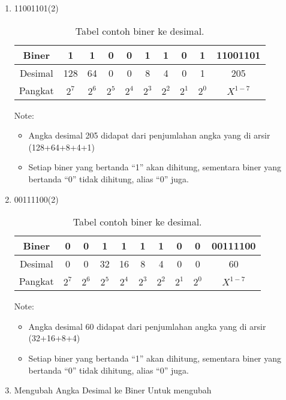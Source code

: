 \documentclass{article}
\begin{document}
\begin{enumerate}
\item 11001101(2) 

\begin{table}[h!]
\centering
\begin{tabular}{ |c|c|c|c|c|c|c|c|c|c| } 
\hline
Biner & 1 & 1 & 0 & 0 & 1 & 1 & 0 & 1 & 11001101 \\ 
\hline
Desimal & 128 & 64 & 0 & 0 & 8 & 4 & 0 & 1 & 205 \\ 
\hline
Pangkat & $2^7$ & $2^6$ & $2^5$ & $2^4$ & $2^3$ & $2^2$ & $2^1$ & $2^0$ & $X^{1-7}$ \\ 
\hline
\end{tabular}
\caption{Tabel contoh biner ke desimal.}
\label{table:contoh2}
\end{table}

Note:

\begin{itemize}
\item Angka desimal 205 didapat dari penjumlahan angka yang di arsir (128+64+8+4+1)
\item Setiap biner yang bertanda “1” akan dihitung, sementara biner yang bertanda “0” tidak dihitung, alias “0” juga.
\end{itemize}

\item 00111100(2) 

\begin{table}[h!]
\centering
\begin{tabular}{ |c|c|c|c|c|c|c|c|c|c| } 
\hline
Biner & 0 & 0 & 1 & 1 & 1 & 1 & 0 & 0 & 00111100 \\ 
\hline
Desimal & 0 & 0 & 32 & 16 & 8 & 4 & 0 & 0 & 60 \\ 
\hline
Pangkat & $2^7$ & $2^6$ & $2^5$ & $2^4$ & $2^3$ & $2^2$ & $2^1$ & $2^0$ & $X^{1-7}$ \\ 
\hline
\end{tabular}
\caption{Tabel contoh biner ke desimal.}
\label{table:contoh2}
\end{table}

Note:
\begin{itemize}
\item Angka desimal 60 didapat dari penjumlahan angka yang di arsir (32+16+8+4)
\item Setiap biner yang bertanda “1” akan dihitung, sementara biner yang bertanda “0” tidak dihitung, alias “0” juga.
\end{itemize}

\item Mengubah Angka Desimal ke Biner 
Untuk mengubah 










\end{enumerate}
\end{document}
